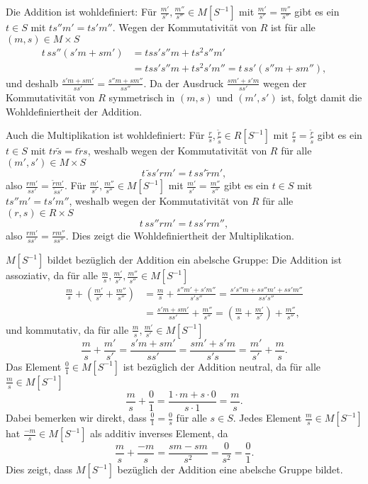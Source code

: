 \documentclass[a4paper,10pt]{article}
\theoremstyle{definition}
\begin{document}
Die Addition ist wohldefiniert: Für $\frac{m'}{s'}, \frac{m''}{s''} \in M[S^{-1}]$ mit $\frac{m'}{s'} = \frac{m''}{s''}$ gibt es ein $t \in S$ mit $ts''m' = ts'm''$. Wegen der Kommutativität von $R$ ist für alle $(m,s) \in M \times S$
\begin{align*}
 t \, ss''(s'm + sm')
 &= tss's''m + ts^2s''m' \\
 &= tss's''m + ts^2s'm''
 = t \, ss'(s''m+sm''),
\end{align*}
und deshalb $\frac{s'm+sm'}{ss'} = \frac{s''m+sm''}{ss''}$. Da der Ausdruck $\frac{sm'+s'm}{ss'}$ wegen der Kommutativität von $R$ symmetrisch in $(m,s)$ und $(m',s')$ ist, folgt damit die Wohldefiniertheit der Addition.

Auch die Multiplikation ist wohldefiniert: Für $\frac{r}{s},\frac{\tilde{r}}{\tilde{s}} \in R[S^{-1}]$ mit $\frac{r}{s} = \frac{\tilde{r}}{\tilde{s}}$ gibt es ein $t \in S$ mit $tr\tilde{s} = t\tilde{r}s$, weshalb wegen der Kommutativität von $R$ für alle $(m',s') \in M \times S$
\[
 t \, \tilde{s}s' rm' = t \, ss' \tilde{r}m',
\]
also $\frac{rm'}{ss'} = \frac{\tilde{r}m'}{\tilde{s}s'}$. Für $\frac{m'}{s'}, \frac{m''}{s''} \in M[S^{-1}]$ mit $\frac{m'}{s'} = \frac{m''}{s''}$ gibt es ein $t \in S$ mit $ts''m' = ts'm''$, weshalb wegen der Kommutativität von $R$ für alle $(r,s) \in R \times S$
\[
 t \, ss'' rm' = t \, ss' rm'',
\]
also $\frac{rm'}{ss'} = \frac{rm''}{ss''}$. Dies zeigt die Wohldefiniertheit der Multiplikation.

$M[S^{-1}]$ bildet bezüglich der Addition ein abelsche Gruppe: Die Addition ist assoziativ, da für alle $\frac{m}{s}, \frac{m'}{s'}, \frac{m''}{s''} \in M[S^{-1}]$
\begin{align*}
 \frac{m}{s} + \left( \frac{m'}{s'} + \frac{m''}{s''} \right)
 &= \frac{m}{s} + \frac{s''m' + s'm''}{s's''}
 = \frac{s's''m + ss''m' + ss'm''}{ss's''} \\
 &= \frac{s'm + sm'}{ss'} + \frac{m''}{s''}
 = \left( \frac{m}{s} + \frac{m'}{s'} \right) + \frac{m''}{s''},
\end{align*}
und kommutativ, da für alle $\frac{m}{s}, \frac{m'}{s'} \in M[S^{-1}]$
\[
 \frac{m}{s} + \frac{m'}{s'}
 = \frac{s'm + sm'}{ss'}
 = \frac{sm' + s'm}{s's}
 = \frac{m'}{s'} + \frac{m}{s}.
\]
Das Element $\frac{0}{1} \in M[S^{-1}]$ ist bezüglich der Addition neutral, da für alle $\frac{m}{s} \in M[S^{-1}]$
\[
 \frac{m}{s} + \frac{0}{1} = \frac{1 \cdot m + s \cdot 0}{s \cdot 1} = \frac{m}{s}.
\]
Dabei bemerken wir direkt, dass $\frac{0}{1} = \frac{0}{s}$ für alle $s \in S$. Jedes Element $\frac{m}{s} \in M[S^{-1}]$ hat $\frac{-m}{s} \in M[S^{-1}]$ als additiv inverses Element, da
\[
 \frac{m}{s} + \frac{-m}{s} = \frac{sm - sm}{s^2} = \frac{0}{s^2} = \frac{0}{1}.
\]
Dies zeigt, dass $M[S^{-1}]$ bezüglich der Addition eine abelsche Gruppe bildet.
\end{document}
